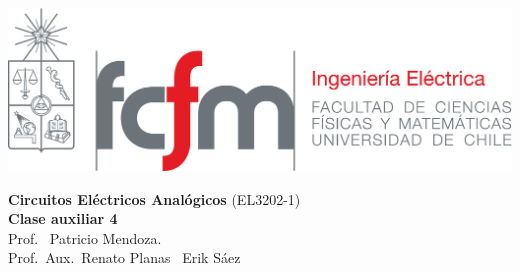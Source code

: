 \documentclass[
  11pt,
  letterpaper,
   addpoints,
  ]{exam}
\begin{document}
\noindent
\begin{minipage}{0.47\textwidth}
\includegraphics[width=\textwidth]{../fcfm_die}
\end{minipage}
\begin{minipage}{0.53\textwidth}
\begin{center} 
\large\textbf{Circuitos Eléctricos Analógicos} (EL3202-1) \\
\large\textbf{Clase auxiliar 4} \\
\normalsize Prof.~ Patricio Mendoza.\\
\normalsize Prof.~Aux.~Renato Planas ~Erik Sáez
\end{center}
\end{minipage}

\vspace{0.5cm}
\noindent
\vspace{.85cm}
\end{document}
